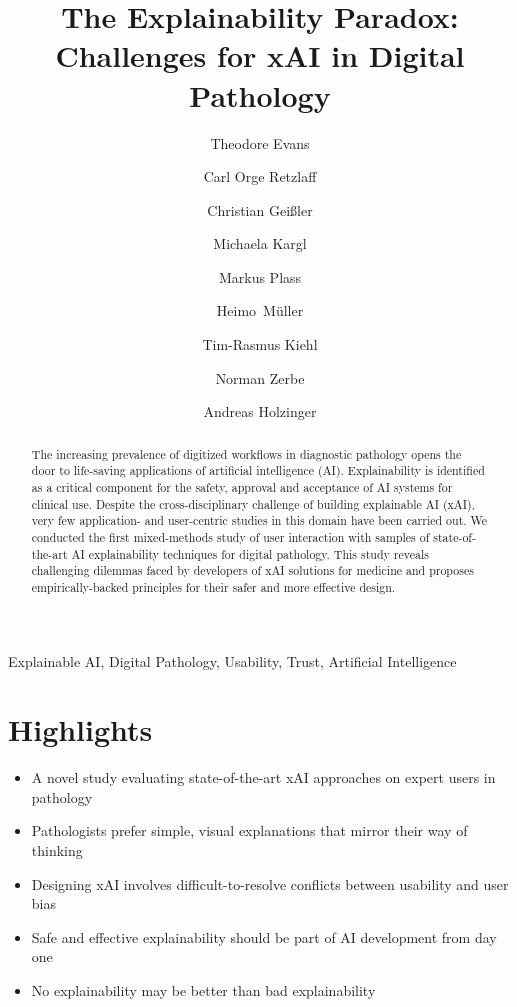 \documentclass[final,5p,times,twocolumn,hyphens]{elsarticle}
\def\corref#1{}%
\begin{document}
\begin{frontmatter}

\title{The Explainability Paradox: Challenges for xAI in Digital Pathology}

\author[TUB]{Theodore Evans\protect\corref{mycorrespondingauthor}}
\author[TUB]{Carl Orge Retzlaff}
\author[TUB]{Christian Geißler}
\author[MUG]{Michaela Kargl}
\author[MUG]{Markus Plass}
\author[MUG]{Heimo~Müller}
\author[CAR]{Tim-Rasmus Kiehl}
\author[CAR]{Norman Zerbe}
\author[MUG]{Andreas Holzinger }

\address[TUB]{DAI-Labor, Technical University of Berlin, Germany}
\address[MUG]{Medical University Graz, Austria}
\address[CAR]{Charité – Universit{\"a}tsmedizin Berlin, corporate member of Freie Universit{\"a}t Berlin and Humboldt- Universit{\"a}t zu Berlin, Institute of Pathology, Germany}

\begin{abstract} 
The increasing prevalence of digitized workflows in diagnostic pathology opens the door to life-saving applications of artificial intelligence (AI). Explainability is identified as a critical component for the safety, approval and acceptance of AI systems for clinical use. Despite the cross-disciplinary challenge of building explainable AI (xAI), very few application- and user-centric studies in this domain have been carried out. We conducted the first mixed-methods study of user interaction with samples of state-of-the-art AI explainability techniques for digital pathology. This study reveals challenging dilemmas faced by developers of xAI solutions for medicine and proposes empirically-backed principles for their safer and more effective design.
\end{abstract}

\begin{keyword}
Explainable AI, Digital Pathology, Usability, Trust, Artificial Intelligence
\end{keyword}

\end{frontmatter}
\linenumbers

\section*{\textbf{Highlights}}

\begin{itemize}
    \item A novel study evaluating state-of-the-art xAI approaches on expert users in pathology
    \item Pathologists prefer simple, visual explanations that mirror their way of thinking
    \item Designing xAI involves difficult-to-resolve conflicts between usability and user bias
    \item Safe and effective explainability should be part of AI development from day one
    \item No explainability may be better than bad explainability
\end{itemize}
\end{document}
